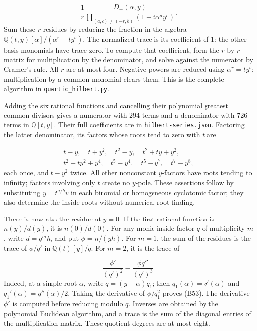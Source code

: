 \documentclass[
]{article}
\begin{document}
\[
\frac1r\frac{D_+(\alpha,y)}{
\prod_{(a,c)\ne(-r,b)}(1-t\alpha^ay^c)}.
\tag{B51}
\] Sum these \(r\) residues by reducing the fraction in the algebra
\(\mathbb Q(t,y)[\alpha]/(\alpha^r-ty^b)\). The normalized trace is its
coefficient of \(1\): the other basis monomials have trace zero. To
compute that coefficient, form the \(r\)-by-\(r\) matrix for
multiplication by the denominator, and solve against the numerator by
Cramer's rule. All \(r\) are at most four. Negative powers are reduced
using \(\alpha^r=ty^b\); multiplication by a common monomial clears
them. This is the complete algorithm in \texttt{quartic\_hilbert.py}.

Adding the six rational functions and cancelling their polynomial
greatest common divisors gives a numerator with 294 terms and a
denominator with 726 terms in \(\mathbb Q [t,y]\). Their full
coefficients are in \texttt{hilbert-series.json}. Factoring the latter
denominator, its factors whose roots tend to zero with \(t\) are
\protect{}\label{equation-B52}{}

\[
\begin{gathered}
t-y,\quad t+y^2,\quad t^2-y,\quad t^2+ty+y^2,\\
t^2+ty^2+y^4,\quad t^5-y^4,\quad t^5-y^7,\quad t^7-y^8,
\end{gathered}
\tag{B52}
\] each once, and \(t-y^2\) twice. All other nonconstant \(y\)-factors
have roots tending to infinity; factors involving only \(t\) create no
\(y\)-pole. These assertions follow by substituting \(y=t^{a/b}v\) in
each binomial or homogeneous cyclotomic factor; they also determine the
inside roots without numerical root finding.

There is now also the residue at \(y=0\). If the first rational function
is \(n(y)/d(y)\), it is \(n(0)/d(0)\). For any monic inside factor \(q\)
of multiplicity \(m\), write \(d=q^m h\), and put \(\phi=n/(yh)\). For
\(m=1\), the sum of the residues is the trace of \(\phi/q'\) in
\(\mathbb Q(t)[y]/q\). For \(m=2\), it is the trace of
\protect{}\label{equation-B53}{}

\[
\frac{\phi'}{(q')^2}-\frac{\phi q''}{(q')^3}.
\tag{B53}
\] Indeed, at a simple root \(\alpha\), write \(q=(y-\alpha)q_1\); then
\(q_1(\alpha)=q'(\alpha)\) and \(q_1'(\alpha)=q''(\alpha)/2\). Taking
the derivative of \(\phi/q_1^2\) proves (B53). The derivative \(\phi'\)
is computed before reducing modulo \(q\). Inverses are obtained by the
polynomial Euclidean algorithm, and a trace is the sum of the diagonal
entries of the multiplication matrix. These quotient degrees are at most
eight.
\end{document}
